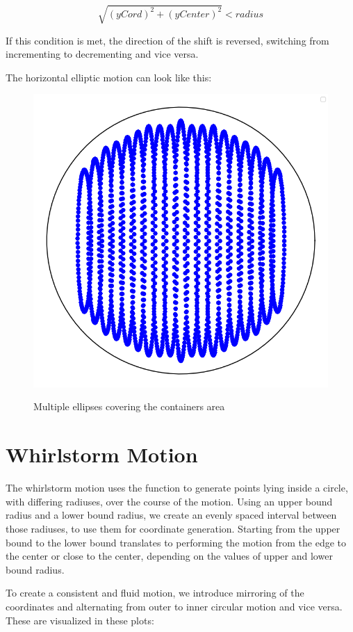 \[\sqrt{(yCord)^2 + (yCenter)^2} < radius\]

If this condition is met, the direction of the shift is reversed, switching from incrementing to decrementing and vice versa.

The horizontal elliptic motion can look like this:

\begin{figure}[H]
    \includegraphics[scale=0.35]{Graphics/motions/horizontal_elliptical.png}
    \centering
    \label{fig:foldingMotion1}
    \caption{Multiple ellipses covering the containers area}
\end{figure}



\section{Whirlstorm Motion}
The whirlstorm motion uses the function to generate points lying inside a circle, with differing radiuses, over the course of the motion. 
Using an upper bound radius and a lower bound radius, we create an evenly spaced interval between those radiuses, to use them for coordinate generation. 
Starting from the upper bound to the lower bound translates to performing the motion from the edge to the center or close to the center, depending on the 
values of upper and lower bound radius. 

To create a consistent and fluid motion, we introduce mirroring of the coordinates and alternating from outer to inner circular motion and vice versa.
These are visualized in these plots:


